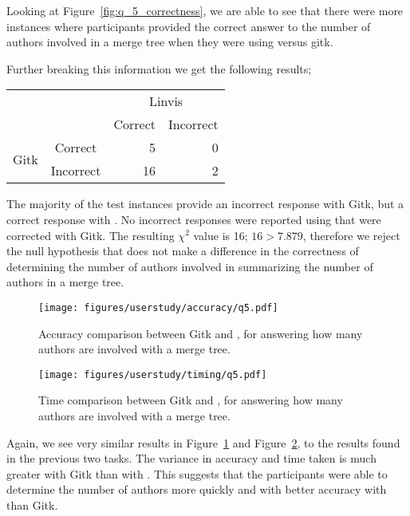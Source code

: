 Looking at Figure~\ref{fig:q_5_correctness}, we are able to see that
there were more instances where participants provided the correct answer
to the number of authors involved in a merge tree when they were using
\tool versus gitk.


Further breaking this information we get the following results;

\begin{center}
  \begin{tabular}{cc|rr}
                           &           & \multicolumn{2}{c}{Linvis}\\
                           &           & Correct                      & Incorrect\\\hline
    \multirow{2}{*}{Gitk}  & Correct   & 5                            & 0\\
                           & Incorrect & 16                           & 2\\
  \end{tabular}
\end{center}

The majority of the test instances provide an incorrect response with
Gitk, but a correct response with \tool. No incorrect responses were
reported using \tool that were corrected with Gitk. The resulting
$\chi^2$ value is 16; $16 > 7.879$, therefore we reject the null
hypothesis that \tool does not make a difference in the correctness of
determining the number of authors involved in summarizing the number of
authors in a merge tree.

\begin{figure}[htpb]
  \centering
  \texttt{[image: figures/userstudy/accuracy/q5.pdf]}
  \caption{Accuracy comparison between Gitk and \tool, for answering how
  many authors are involved with a merge tree.}
  \label{fig:q5_accuracy}
\end{figure}

\begin{figure}[htpb]
  \centering
  \texttt{[image: figures/userstudy/timing/q5.pdf]}
  \caption{Time comparison between Gitk and \tool, for answering how
  many authors are involved with a merge tree.}
  \label{fig:q5_timing}
\end{figure}

Again, we see very similar results in Figure~\ref{fig:q5_accuracy} and
Figure~\ref{fig:q5_timing}, to the results found in the previous two
tasks. The variance in accuracy and time taken is much greater with
Gitk than with \tool. This suggests that the participants were able to
determine the number of authors more quickly and with better accuracy
with \tool than Gitk.

